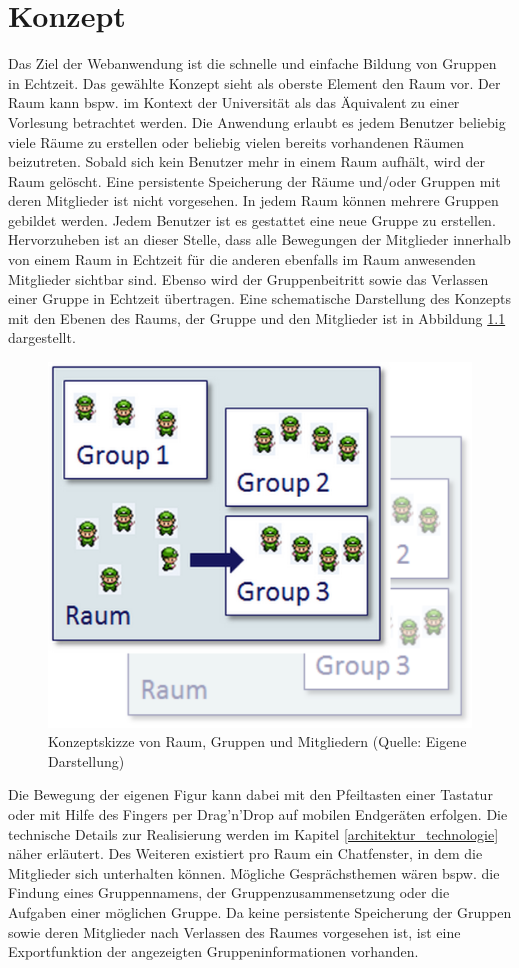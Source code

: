 \chapter{Konzept}
\label{konzept}

Das Ziel der Webanwendung ist die schnelle und einfache Bildung von Gruppen in Echtzeit. Das gewählte Konzept sieht als oberste Element den Raum vor. Der Raum kann bspw. im Kontext der Universität als das Äquivalent zu einer Vorlesung betrachtet werden. Die Anwendung erlaubt es jedem Benutzer beliebig viele Räume zu erstellen oder beliebig vielen bereits vorhandenen Räumen beizutreten. Sobald sich kein Benutzer mehr in einem Raum aufhält, wird der Raum gelöscht. Eine persistente Speicherung der Räume und/oder Gruppen mit deren Mitglieder ist nicht vorgesehen. 
\newline\newline
In jedem Raum können mehrere Gruppen gebildet werden. Jedem Benutzer ist es gestattet eine neue Gruppe zu erstellen. Hervorzuheben ist an dieser Stelle, dass alle Bewegungen der Mitglieder innerhalb von einem Raum in Echtzeit für die anderen ebenfalls im Raum anwesenden Mitglieder sichtbar sind. Ebenso wird der Gruppenbeitritt sowie das Verlassen einer Gruppe in Echtzeit übertragen. Eine schematische Darstellung des Konzepts mit den Ebenen des Raums, der Gruppe und den Mitglieder ist in Abbildung \ref{konzeptskizze} dargestellt.

\begin{figure}[h]
\centering
\includegraphics[width=0.35\linewidth]{graphiken/konzeptskizze.png}%
\caption{Konzeptskizze von Raum, Gruppen und Mitgliedern (Quelle: Eigene Darstellung)}%
\label{konzeptskizze}%
\end{figure}

Die Bewegung der eigenen Figur kann dabei mit den Pfeiltasten einer Tastatur oder mit Hilfe des Fingers per Drag'n'Drop auf mobilen Endgeräten erfolgen. Die technische Details zur Realisierung werden im Kapitel \ref{architektur_technologie} näher erläutert. Des Weiteren existiert pro Raum ein Chatfenster, in dem die Mitglieder sich unterhalten können. Mögliche Gesprächsthemen wären bspw. die Findung eines Gruppennamens, der Gruppenzusammensetzung oder die Aufgaben einer möglichen Gruppe. Da keine persistente Speicherung der Gruppen sowie deren Mitglieder nach Verlassen des Raumes vorgesehen ist, ist eine Exportfunktion der angezeigten Gruppeninformationen vorhanden.
